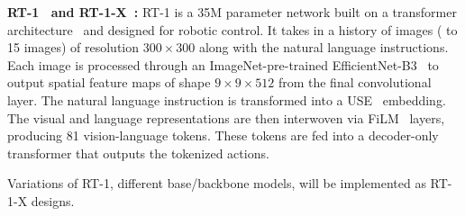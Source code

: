 \documentclass[11pt,letterpaper]{article}
\begin{document}
\noindent\textbf{ RT-1~\cite{rt-1} and RT-1-X~\cite{9}:} RT-1 is a 35M parameter network built on a transformer architecture~\cite{vaswani2017attention} and designed for robotic control. 
It takes in a history of images ( to 15 images) of resolution $300\times300$ along with the natural language instructions. 
Each image is processed through an ImageNet-pre-trained EfficientNet-B3~\cite{tan2019efficientnet} to output spatial feature maps of shape $9\times9\times512$ from the final convolutional layer.
The natural language instruction is transformed into a USE~\cite{cer2018universal} embedding. 
The visual and language representations are then interwoven via FiLM~\cite{perez2017film} layers, producing 81 vision-language tokens. 
These tokens are fed into a decoder-only transformer that outputs the tokenized actions.

Variations of RT-1, \eg different base/backbone models, %
will be implemented as RT-1-X designs.
\end{document}
